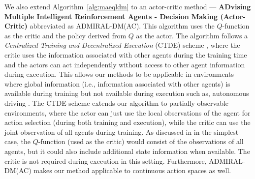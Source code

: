 \documentclass[jair, twoside,11pt,theapa]{article}
\begin{document}
We also extend Algorithm~\ref{alg:maeqldm} to an actor-critic method --- \textbf{ADvising Multiple Intelligent Reinforcement Agents - Decision Making (Actor-Critic)} abbreviated as ADMIRAL-DM(AC). This algorithm uses the $Q$-function as the critic and the policy derived from $Q$ as the actor. The algorithm follows a \emph{Centralized Training and Decentralized Execution} (CTDE) scheme \citep{lowe2017multi}, where the critic uses the information associated with other agents during the training time and the actors can act independently without access to other agent information during execution. 
This allows our methods to be applicable in environments where global information (i.e., information associated with other agents) is available during training but not available during execution such as, autonomous driving \citep{Ming2020scalable}.
The CTDE scheme extends our algorithm to partially observable environments, where the actor can just use the local observations of the agent for action selection (during both training and execution), while the critic can use the joint observation of all agents during training. As discussed in \cite{lowe2017multi} in the simplest case, the $Q$-function (used as the critic) would consist of the observations of all agents, but it could also include additional state information when available. The critic is not required during execution in this setting.   Furthermore, ADMIRAL-DM(AC) makes our method applicable to continuous action spaces as well. 
\end{document}

